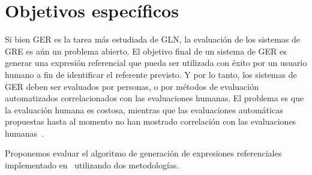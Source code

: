 \section{Objetivos espec\'ificos}
\label{objetivos}

Si bien GER es la tarea m\'as estudiada de GLN, la evaluaci\'on de los sistemas de GRE es a\'un un problema abierto. El objetivo final de un sistema de GER es generar una expresi\'on referencial que pueda ser utilizada con \'exito por un usuario humano a fin de identificar el referente previsto. Y por lo tanto, los sistemas de GER deben ser evaluados por personas, o por m\'etodos de evaluaci\'on automatizados correlacionados con las evaluaciones humanas. El problema es que la evaluaci\'on humana es costosa, mientras que las evaluaciones autom\'aticas propuestas hasta al momento no han mostrado correlaci\'on con las evaluaciones humanas~\cite{reiter09}.

Proponemos evaluar el algoritmo de generaci\'on de expresiones referenciales implementado en~\cite{Areces2008} utilizando dos metodolog\'ias. 

